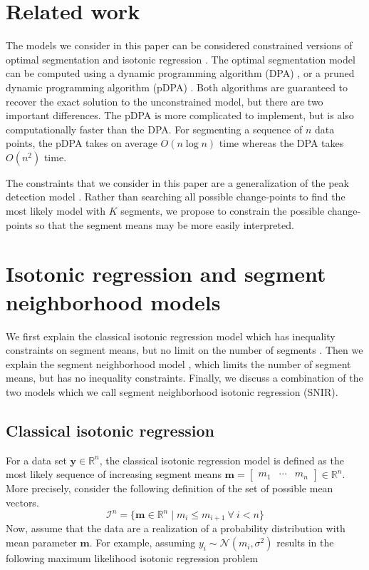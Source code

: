 \documentclass{article}
\newcommand{\RR}{\mathbb R}
\begin{document}
\section{Related work}
\label{sec:related}

The models we consider in this paper can be considered constrained
versions of optimal segmentation \citep{Segmentor} and isotonic
regression \citep{mair2009isotone}. The optimal segmentation model can
be computed using a dynamic programming algorithm (DPA)
\citep{bellman, segment-neighborhood, optimal-partitioning}, or a
pruned dynamic programming algorithm (pDPA) \citep{pruned-dp}. Both
algorithms are guaranteed to recover the exact solution to the
unconstrained model, but there are two important differences. The pDPA
is more complicated to implement, but is also computationally faster
than the DPA. For segmenting a sequence of $n$ data points, the pDPA
takes on average $O(n\log n)$ time whereas the DPA takes $O(n^2)$
time.

The constraints that we consider in this paper are a generalization of
the peak detection model \citep{HOCKING-PeakSeg}. Rather than
searching all possible change-points to find the most likely model
with $K$ segments, we propose to constrain the possible change-points
so that the segment means may be more easily interpreted.

\section{Isotonic regression and segment neighborhood models}

We first explain the classical isotonic regression model which has
inequality constraints on segment means, but no limit on the number of
segments \citep{mair2009isotone}. Then we explain the segment
neighborhood model \citep{segment-neighborhood}, which limits the
number of segment means, but has no inequality constraints. Finally,
we discuss a combination of the two models which we call segment
neighborhood isotonic regression (SNIR).

\subsection{Classical isotonic regression}

For a data set $\mathbf y\in\RR^n$, the classical isotonic regression
model is defined as the most likely sequence of increasing segment
means $\mathbf m = \left[
\begin{array}{ccc}
  m_1& \cdots &m_n
\end{array}
\right]
\in\RR^n$. More precisely, consider the following definition
of the set of possible mean vectors.
\begin{equation}
  \mathcal I^n = \{\mathbf m\in\RR^n \mid m_i \leq m_{i+1} \ \forall\ i<n\}
\end{equation}
Now, assume that the data are a realization of a probability
distribution with mean parameter $\mathbf m$. For example, assuming
$y_i \sim \mathcal N(m_i, \sigma^2)$ results in the following maximum
likelihood isotonic regression problem
\end{document}
